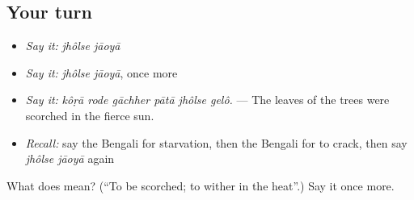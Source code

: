 \subsection*{Your turn}
\begin{itemize}
\raggedright
  \item \emph{Say it:} \emph{jhôlse jāoyā}
  \item \emph{Say it:} \emph{jhôlse jāoyā}, once more
  \item \emph{Say it:} \emph{kôṛā rode gāchher pātā jhôlse gelô.} — The leaves of the trees were scorched in the fierce sun.
  \item \emph{Recall:} say the Bengali for starvation, then the Bengali for to crack, then say \emph{jhôlse jāoyā} again
\end{itemize}

\begin{tcolorbox}[breakable,colback=teal!4,colframe=teal!35!black,title={Before you move on}]
What does   mean? (\textquotedblleft{}To be scorched; to wither in the heat\textquotedblright{}.) Say it once more.
\end{tcolorbox}
